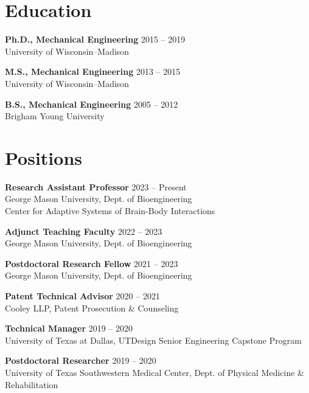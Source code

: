 \documentclass[letterpaper, 10pt]{article}
\begin{document}
\section{Education}

\textbf{Ph.D., Mechanical Engineering}
\hfill 2015 -- 2019\\ %
University of Wisconsin–Madison %
\medskip

\textbf{M.S., Mechanical Engineering}
\hfill 2013 -- 2015\\ %
University of Wisconsin–Madison %
\medskip

\textbf{B.S., Mechanical Engineering}
\hfill 2005 -- 2012\\ %
Brigham Young University %

\section{Positions}

\textbf{Research Assistant Professor}
\hfill 2023 -- Present\\ %
George Mason University, Dept. of Bioengineering\\
Center for Adaptive Systems of Brain-Body Interactions
\medskip

\textbf{Adjunct Teaching Faculty}
\hfill 2022 -- 2023\\ %
George Mason University, Dept. of Bioengineering
\medskip

\textbf{Postdoctoral Research Fellow}
\hfill 2021 -- 2023\\ %
George Mason University, Dept. of Bioengineering
\medskip

\textbf{Patent Technical Advisor}
\hfill 2020 -- 2021\\ %
Cooley LLP, Patent Prosecution \& Counseling %
\medskip

\textbf{Technical Manager}
\hfill 2019 -- 2020\\ %
University of Texas at Dallas, UTDesign Senior Engineering Capstone Program %
\medskip

\textbf{Postdoctoral Researcher}
\hfill 2019 -- 2020\\ %
University of Texas Southwestern Medical Center, Dept. of Physical Medicine \& Rehabilitation %
\medskip
\end{document}
